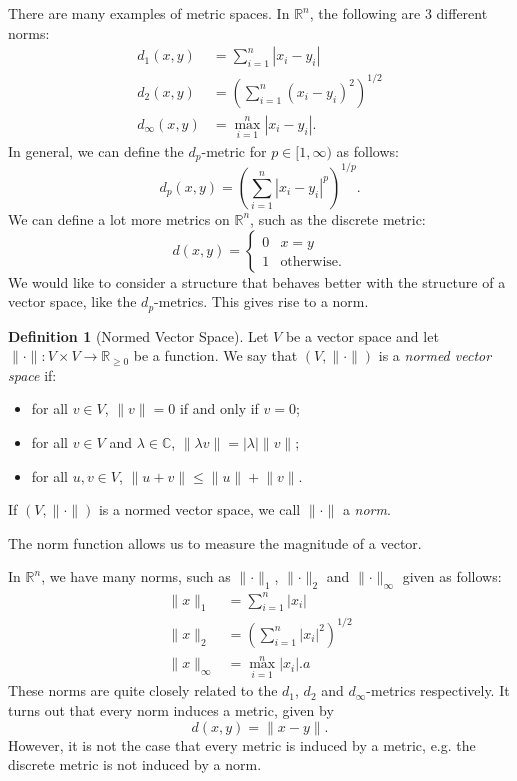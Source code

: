 \documentclass[a4paper, openany]{memoir}
\theoremstyle{definition}
\newtheorem{definition}{Definition}[section]
\theoremstyle{plain}
\begin{document}
    There are many examples of metric spaces. In $\mathbb{R}^n$, the following are 3 different norms:
    \begin{align*}
        d_1(x, y) &= \sum_{i=1}^n |x_i - y_i| \\
        d_2(x, y) &= \left(\sum_{i=1}^n (x_i - y_i)^2\right)^{1/2} \\
        d_\infty(x, y) &= \max_{i=1}^n |x_i - y_i|.
    \end{align*}
    In general, we can define the $d_p$-metric for $p \in [1, \infty)$ as follows:
    \[d_p(x, y) = \left(\sum_{i=1}^n |x_i - y_i|^p \right)^{1/p}.\]
    We can define a lot more metrics on $\mathbb{R}^n$, such as the discrete metric:
    \[d(x, y) = \begin{cases}
        0 & x = y \\
        1 & \textrm{otherwise}.
    \end{cases}\]
    We would like to consider a structure that behaves better with the structure of a vector space, like the $d_p$-metrics. This gives rise to a norm.
    \begin{definition}[Normed Vector Space]
        Let $V$ be a vector space and let $\lVert \cdot \rVert \colon V \times V \to \mathbb{R}_{\geq 0}$ be a function. We say that $(V, \lVert \cdot \rVert)$ is a \emph{normed vector space} if:
        \begin{itemize}
            \item for all $v \in V$, $\lVert v \rVert = 0$ if and only if $v = 0$;
            \item for all $v \in V$ and $\lambda \in \mathbb{C}$, $\lVert \lambda v \rVert = |\lambda| \lVert v \rVert$;
            \item for all $u, v \in V$, $\lVert u + v \rVert \leq \lVert u \rVert + \lVert v \rVert$.
        \end{itemize}
        If $(V, \lVert \cdot \rVert)$ is a normed vector space, we call $\lVert \cdot \rVert$ a \emph{norm}.
    \end{definition}
    \noindent The norm function allows us to measure the magnitude of a vector.

    In $\mathbb{R}^n$, we have many norms, such as $\lVert \cdot \rVert_1$, $\lVert \cdot \rVert_2$ and $\lVert \cdot \rVert_\infty$ given as follows:
    \begin{align*}
        \lVert x \rVert_1 &= \sum_{i=1}^n |x_i| \\
        \lVert x \rVert_2 &= \left(\sum_{i=1}^n |x_i|^2 \right)^{1/2} \\
        \lVert x \rVert_\infty &= \max_{i=1}^n |x_i|.
a    \end{align*}
    These norms are quite closely related to the $d_1$, $d_2$ and $d_\infty$-metrics respectively. It turns out that every norm induces a metric, given by
    \[d(x, y) = \lVert x - y \rVert.\]
    However, it is not the case that every metric is induced by a metric, e.g. the discrete metric is not induced by a norm.
\end{document}
